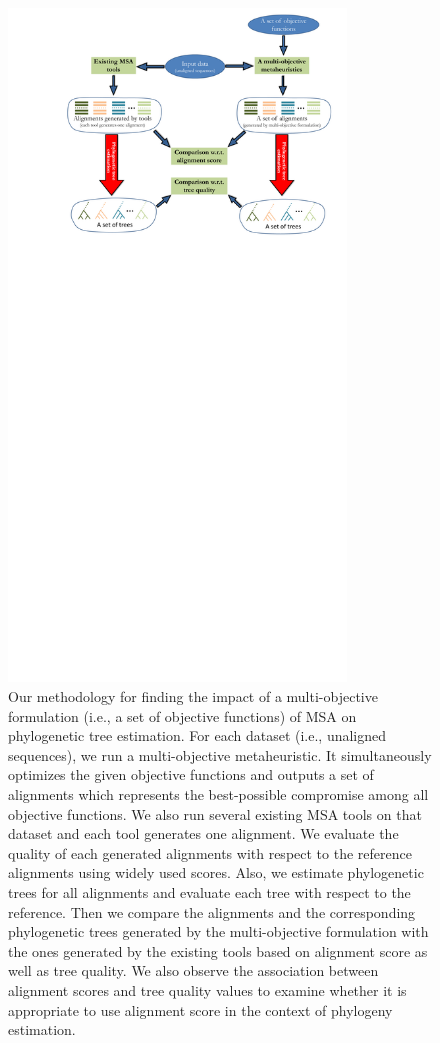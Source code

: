 \begin{figure}[!htbp]
	\centering

	\includegraphics[width=0.8\textwidth]{Figure/pipeline}
	\caption[Our methodology for finding the impact of a multi-objective formulation of MSA on phylogenetic tree estimation.]{Our methodology for finding the impact of a multi-objective formulation (i.e., a set of objective functions) of MSA on phylogenetic tree estimation. For each dataset (i.e., unaligned sequences), we run a multi-objective metaheuristic. It simultaneously optimizes the given objective functions and outputs a set of alignments which represents the best-possible compromise among all objective functions. We also run several existing MSA tools on that dataset and each tool generates one alignment. We evaluate the quality of each generated alignments with respect to the reference alignments using widely used scores. Also, we estimate phylogenetic trees for all alignments and evaluate each tree with respect to the reference. Then we compare the alignments and the corresponding phylogenetic trees generated by the multi-objective formulation with the ones generated by the existing tools based on alignment score as well as tree quality. We also observe the association between alignment scores and tree quality values to examine whether it is appropriate to use alignment score in the context of phylogeny estimation.}
	\label{fig:pipeline}


\end{figure}
